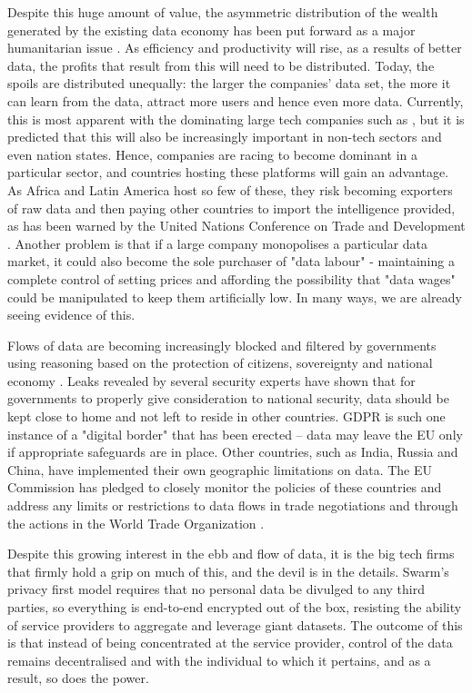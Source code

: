 Despite this huge amount of value, the asymmetric distribution of the wealth generated by the existing data economy has been put forward as a major humanitarian issue \cite{TheWinner2020Feb}. As efficiency and productivity will rise, as a results of better data, the profits that result from this will need to be distributed. Today, the spoils are distributed unequally: the larger the companies' data set, the more it can learn from the data, attract more users and hence even more data. Currently, this is most apparent with the dominating large tech companies such as , but it is predicted that this will also be increasingly important in non-tech sectors and even nation states. Hence, companies are racing to become dominant in a particular sector, and countries hosting these platforms will gain an advantage. As Africa and Latin America host so few of these, they risk becoming exporters of raw data and then paying other countries to import the intelligence provided, as has been warned by the United Nations Conference on Trade and Development \cite{TheWinner2020Feb}. Another problem is that if a large company monopolises a particular data market, it could also become the sole purchaser of "data labour" - maintaining a complete control of setting prices and affording the possibility that "data wages" could be manipulated to keep them artificially low. In many ways, we are already seeing evidence of this. 


Flows of data are becoming increasingly blocked and filtered by governments using reasoning based on the protection of citizens, sovereignty and national economy \cite{VirtualNationalism2020Feb}. Leaks revealed by several security experts have shown that for governments to properly give consideration to national security,  data should be kept close to home and not left to reside in other countries. GDPR is such one instance of a "digital border" that has been erected -- data may leave the EU only if appropriate safeguards are in place. Other countries, such as India, Russia and China, have implemented their own geographic limitations on data. The EU Commission has pledged to closely monitor the policies of these countries and address any limits or restrictions to data flows in trade negotiations and through the actions in the World Trade Organization \cite{EUWhitePaperAI2020Feb}.

Despite this growing interest in the ebb and flow of data, it is the big tech firms that firmly hold a grip on much of this, and the devil is in the details. Swarm's privacy first model requires that no personal data be divulged to any third parties, so everything is end-to-end encrypted out of the box, resisting the ability of service providers to aggregate and leverage giant datasets. The outcome of this is that instead of being concentrated at the service provider, control of the data remains decentralised and with the individual to which it pertains, and as a result, so does the power.

